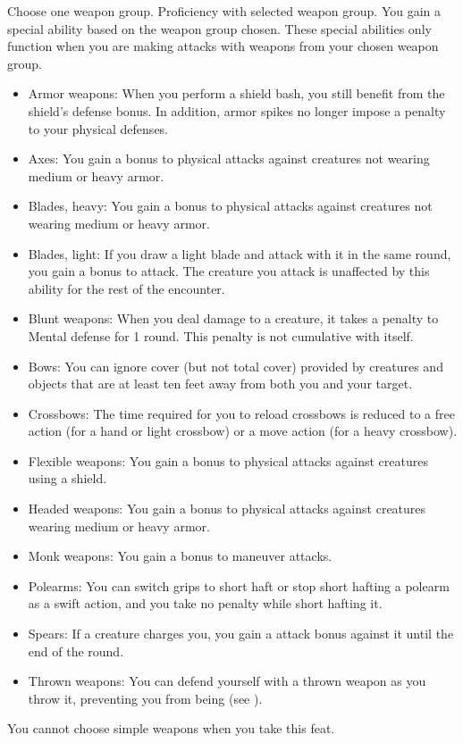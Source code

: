 Choose one weapon group.
\featpre Proficiency with selected weapon group.
\featben You gain a special ability based on the weapon group chosen.
These special abilities only function when you are making attacks with weapons from your chosen weapon group.
\begin{itemize}
    \item Armor weapons: When you perform a shield bash, you still benefit from the shield's defense bonus.
        In addition, armor spikes no longer impose a penalty to your physical defenses.
    \item Axes: You gain a  bonus to physical attacks against creatures not wearing medium or heavy armor.
    \item Blades, heavy: You gain a  bonus to physical attacks against creatures not wearing medium or heavy armor.
    \item Blades, light: If you draw a light blade and attack with it in the same round, you gain a  bonus to attack.
        The creature you attack is unaffected by this ability for the rest of the encounter.
    \item Blunt weapons: When you deal damage to a creature, it takes a  penalty to Mental defense for 1 round.
        This penalty is not cumulative with itself.
    \item Bows: You can ignore cover (but not total cover) provided by creatures and objects that are at least ten feet away from both you and your target.
    \item Crossbows: The time required for you to reload crossbows is reduced to a free action (for a hand or light crossbow) or a move action (for a heavy crossbow).
    \item Flexible weapons: You gain a  bonus to physical attacks against creatures using a shield.
    \item Headed weapons: You gain a  bonus to physical attacks against creatures wearing medium or heavy armor.
    \item Monk weapons: You gain a  bonus to maneuver attacks.
    \item Polearms: You can switch grips to short haft or stop short hafting a polearm as a swift action, and you take no penalty while short hafting it.
    \item Spears: If a creature charges you, you gain a  attack bonus against it until the end of the round.
    \item Thrown weapons: You can defend yourself with a thrown weapon as you throw it, preventing you from being  (see ).
\end{itemize}
You cannot choose simple weapons when you take this feat.

